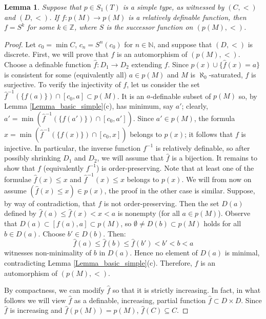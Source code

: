 \documentclass[10pt,a4paper]{amsart}
\newtheorem{Lemma}[Theorem]{Lemma}
\theoremstyle{definition}
\begin{document}
\begin{Lemma}\label{Lemma_f_is_Sn}
Suppose that  $p\in S_1(T)$ is a simple type, as witnessed by $(C,<)$ and $(D,<)$.  If $f:p(M)\to p(M)$ is a relatively definable function, then $f=S^k$ for some $k\in\mathbb Z$, where $S$ is the successor function on $(p(M),<)$.
\end{Lemma}
\begin{proof}Let $c_0=\min C$, $c_n=S^n(c_0)$ for $n\in\mathbb N$, and  suppose that $(D,<)$ is discrete.   
First, we will prove that $f$ is an automorphism of $(p(M),<)$. Choose a definable function $\hat f:D_1\to D_2$ extending $f$. Since $p(x)\cup\{\hat f(x)=a\}$ is consistent for some (equivalently all) $a\in p(M)$ and $M$ is $\aleph_0$-saturated, $f$ is surjective.
To verify the injectivity of $f$, let us consider the set $\hat f^{-1}(\{f(a)\})\cap [c_0,a]\subset p(M)$. It is an $a$-definable subset of $p(M)$ so, by Lemma \ref{Lemma_basic_simple}(c), has minimum, say $a'$; clearly,   $a'=\min(\hat f^{-1}(\{f(a')\})\cap [c_0,a'])$. Since  $a'\in p(M)$, the formula  $x=\min(\hat f^{-1}(\{f(x)\})\cap [c_0,x])$ belongs to $p(x)$; it follows that $f$ is injective. 
In particular, the inverse function $f^{-1}$ is relatively definable, so after possibly shrinking $D_1$ and $D_2$, we will assume that $\hat f$ is a bijection.
It remains to show that $f$ (equivalently $f^{-1}$) is order-preserving. 
Note that at least one of the formulae $\hat f(x)\leq x$ and $\hat f^{-1}(x)\leq x$ belongs to $p(x)$. We will from now on assume $(\hat f(x)\leq x)\in p(x)$, the proof in the other case is similar.
Suppose, by way of contradiction, that $f$ is not order-preserving. Then the set $D(a)$ defined by $\hat f(a)\leq \hat f(x)<x<a$ is nonempty (for all $a\in p(M)$). Observe that  $D(a)\subset [f(a),a]\subset p(M)$,  so  $\emptyset\neq D(b)\subset p(M)$ holds for all $b\in D(a)$. Choose $b'\in D(b)$. Then:  
$$\hat f(a)\leq \hat f(b)\leq \hat f(b')<b'<b<a$$ witnesses non-minimality of $b$ in $D(a)$. Hence no element of $D(a)$ is minimal, contradicting Lemma \ref{Lemma_basic_simple}(c). Therefore, $f$ is an automorphism of $(p(M),<)$. 

By compactness, we can modify $\hat f$ so that it is strictly increasing. In fact, in what follows we will view $\hat f$ as a definable, increasing, partial function  $\hat f\subset D\times D$. Since $\hat f$ is increasing and $\hat f(p(M))=p(M)$, $\hat f(C)\subseteq C$.



\end{proof}
\end{document}
